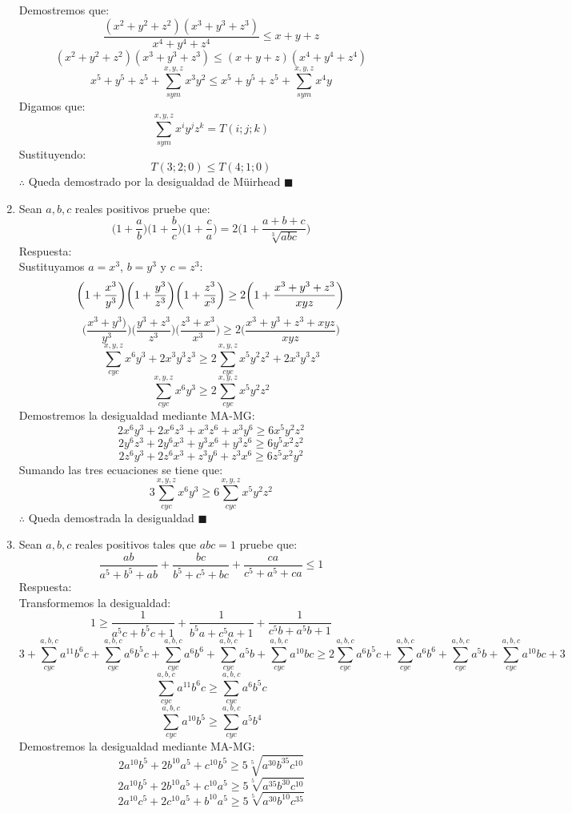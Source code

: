 \documentclass{book}
\begin{document}
\begin{enumerate}
			Demostremos que:
$$\frac{(x^2+y^2+z^2 )(x^3+y^3+z^3 )}{x^4+y^4+z^4 }\leq x+y+z$$
$$(x^2+y^2+z^2 )(x^3+y^3+z^3 )\leq(x+y+z)(x^4+y^4+z^4 )$$
$$x^5+y^5+z^5+\sum_{sym}^{x,y,z}x^3 y^2\leq x^5+y^5+z^5+\sum_{sym}^{x,y,z}x^4 y$$
Digamos que:
$$\sum_{sym}^{x,y,z}x^i y^j z^k =T(i; j; k)$$
Sustituyendo:
$$T(3; 2; 0)\leq T(4;1;0)$$
$\therefore$ Queda demostrado por la desigualdad de Müirhead $\blacksquare$\\
				\item Sean $a,b,c$ reales positivos pruebe que: 
			$$\bigg(1+\frac{a}{b}\bigg)\bigg(1+\frac{b}{c}\bigg)\bigg(1+\frac{c}{a}\bigg)=2\bigg(1+\frac{a+b+c}{\sqrt[3]{abc}}\bigg)$$
			Respuesta:\\
			Sustituyamos $a=x^3$, $b=y^3$ y $c=z^3$:
$$\bigg(1+{x^3\over y^3} \bigg)\bigg(1+{y^3\over z^3} \bigg)\bigg(1+{z^3\over x^3} \bigg)\geq 2\bigg(1+\frac{x^3+y^3+z^3}{xyz}\bigg)$$
$$\bigg(\frac{x^3+y^3)}{y^3} \bigg)\bigg(\frac{y^3+z^3}{z^3} \bigg)\bigg(\frac{z^3+x^3}{x^3} \bigg)\geq 2\bigg(\frac{x^3+y^3+z^3+xyz}{xyz}\bigg)$$
$$\sum_{cyc}^{x,y,z}x^6 y^3+2x^3 y^3 z^3\geq 2\sum_{cyc}^{x,y,z}x^5 y^2 z^2 +2x^3 y^3 z^3$$
$$\sum_{cyc}^{x,y,z}x^6 y^3\geq 2\sum_{cyc}^{x,y,z}x^5 y^2 z^2 $$
Demostremos la desigualdad mediante MA-MG:
$$2x^6 y^3+2x^6 z^3+x^3 z^6+x^3 y^6\geq 6x^5 y^2 z^2$$
$$2y^6 z^3+2y^6 x^3+y^3 x^6+y^3 z^6\geq 6y^5 x^2 z^2$$
$$2z^6 y^3+2z^6 x^3+z^3 y^6+z^3 x^6\geq 6z^5 x^2 y^2$$
Sumando las tres ecuaciones se tiene que:
$$3\sum_{cyc}^{x,y,z}x^6 y^3\geq 6\sum_{cyc}^{x,y,z}x^5 y^2 z^2$$
$\therefore$ Queda demostrada la desigualdad $\blacksquare$\\
				\item Sean $a,b,c$ reales positivos tales que $abc=1$ pruebe que:
			$$\frac{ab}{a^5+b^5+ab}+\frac{bc}{b^5+c^5+bc}+\frac{ca}{c^5+a^5+ca}\leq 1$$
			Respuesta:\\
			Transformemos la desigualdad:
$$1\geq\frac{1}{a^5 c+b^5 c+1}+\frac{1}{b^5 a+c^5 a+1}+\frac{1}{c^5 b+a^5 b+1}$$
$$3+\sum_{cyc}^{a,b,c}a^{11} b^6 c+\sum_{cyc}^{a,b,c}a^6 b^5 c+\sum_{cyc}^{a,b,c}a^6 b^6+\sum_{cyc}^{a,b,c}a^5 b+\sum_{cyc}^{a,b,c}a^{10} bc\geq 2\sum_{cyc}^{a,b,c}a^6 b^5c+\sum_{cyc}^{a,b,c}a^6 b^6 +\sum_{cyc}^{a,b,c}a^5 b+\sum_{cyc}^{a,b,c}a^{10} bc+3$$
$$\sum_{cyc}^{a,b,c}a^{11} b^6 c\geq\sum_{cyc}^{a,b,c}a^6 b^5c$$
$$\sum_{cyc}^{a,b,c}{a^{10} b^5}\geq\sum_{cyc}^{a,b,c}a^5 b^4 $$
Demostremos la desigualdad mediante MA-MG:
$$2 a^{10}b^5 +2 b^{10}a^5 +c^{10}b^5 \geq 5 \sqrt[5]{ a^{30}b^{35}c^{10}}$$
$$2 a^{10}b^5 +2 b^{10}a^5 +c^{10}a^5 \geq 5 \sqrt[5]{ a^{35}b^{30}c^{10}}$$
$$2 a^{10}c^5 +2 c^{10}a^5 +b^{10}a^5 \geq 5 \sqrt[5]{ a^{30}b^{10}c^{35}}$$

\end{enumerate}
\end{document}
